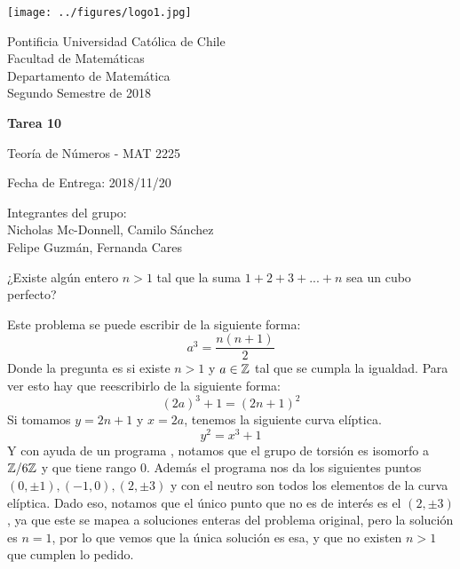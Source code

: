 


\begin{minipage}{2.5cm}
	\texttt{[image: ../figures/logo1.jpg]}
\end{minipage}
\begin{minipage}{13cm}
	\begin{flushleft}
		\raggedright
		{
			\noindent
			{\sc Pontificia Universidad Católica de Chile\\
				Facultad de Matemáticas\\
				Departamento de Matemática} \smallskip \\
			Segundo Semestre de 2018\\
		}
	\end{flushleft}
\end{minipage}

\vspace{2ex}
{\Large \centerline{\bf Tarea 10}}
{\large \centerline{Teoría de Números - MAT 2225}}
\centerline{Fecha de Entrega: 2018/11/20}

\begin{flushright}
	Integrantes del grupo:\\
	Nicholas Mc-Donnell, Camilo Sánchez\\
	Felipe Guzmán, Fernanda Cares
\end{flushright}

\begin{prob}[10 pts.]
	¿Existe algún entero $n>1$ tal que la suma $1+2+3+...+n$ sea un cubo perfecto?
\end{prob}

\begin{sol}
	Este problema se puede escribir de la siguiente forma:
	\[
		a^3=\frac{n(n+1)}2
	\]
	Donde la pregunta es si existe $n>1$ y $a\in\mathbb{Z}$ tal que se cumpla la igualdad. Para ver esto hay que reescribirlo de la siguiente forma:
	\[
		(2a)^3+1=(2n+1)^2
	\]
	Si tomamos $y=2n+1$ y $x=2a$, tenemos la siguiente curva elíptica.
	\[
		y^2=x^3+1
	\]
	Y con ayuda de un programa \citep{prog}, notamos que el grupo de torsión es isomorfo a $\mathbb{Z}/6\mathbb{Z}$  y que tiene rango $0$. Además el programa nos da los siguientes puntos $(0,\pm1),(-1,0),(2,\pm3)$ y con el neutro son todos los elementos de la curva elíptica. Dado eso, notamos que el único punto que no es de interés es el $(2,\pm 3)$, ya que este se mapea a soluciones enteras del problema original, pero la solución es $n=1$, por lo que vemos que la única solución es esa, y que no existen $n>1$ que cumplen lo pedido.
\end{sol}

